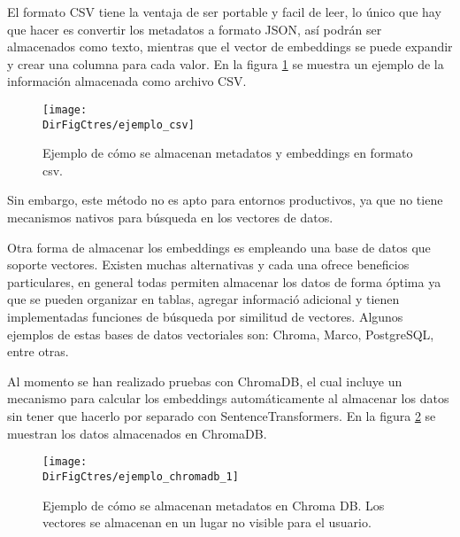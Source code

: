 El formato CSV tiene la ventaja de ser portable y facil de leer, lo único que
hay que hacer es convertir los metadatos a formato JSON, así podrán ser
almacenados como texto, mientras que el vector de embeddings se puede
expandir y crear una columna para cada valor. En la figura \ref{fig:ejemplo_csv}
se muestra un ejemplo de la información almacenada como archivo CSV.

\begin{figure}[]
    \centering
    \texttt{[image: \\DirFigCtres/ejemplo\_csv]}
    \caption{Ejemplo de cómo se almacenan metadatos y embeddings en formato csv.}
    \label{fig:ejemplo_csv}
\end{figure}

Sin embargo, este método no es apto para entornos productivos, ya que no tiene
mecanismos nativos para búsqueda en los vectores de datos.

Otra forma de almacenar los embeddings es empleando una base de datos que
soporte vectores. Existen muchas alternativas y cada una ofrece beneficios
particulares, en general todas permiten almacenar los datos de forma
óptima ya que se pueden organizar en tablas, agregar informació adicional y
tienen implementadas funciones de búsqueda por similitud de vectores.
Algunos ejemplos de estas bases de datos vectoriales son: Chroma, Marco,
PostgreSQL, entre otras.

Al momento se han realizado pruebas con ChromaDB, el cual incluye un
mecanismo para calcular los embeddings automáticamente al almacenar los datos
sin tener que hacerlo por separado con SentenceTransformers. En la figura
\ref{fig:ejemplo_chromadb} se muestran los datos almacenados en ChromaDB.

\begin{figure}[]
    \centering
    \texttt{[image: \\DirFigCtres/ejemplo\_chromadb\_1]}
    \caption{Ejemplo de cómo se almacenan metadatos en Chroma DB. Los vectores
        se almacenan en un lugar no visible para el usuario.}
    \label{fig:ejemplo_chromadb}
\end{figure}